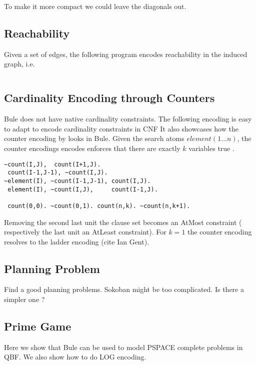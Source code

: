 \documentclass[conference]{IEEEtran}
\begin{document}
To make it more compact we could leave the diagonals out. 

\subsection{Reachability}

Given a set of edges, the following program encodes reachability in the induced graph, i.e. 

\begin{lstlisting}

\end{lstlisting}

\subsection{Cardinality Encoding through Counters}

Bule does not have native cardinality constraints. 
The following encoding is easy to adapt to encode cardinality constraints in CNF 
It also showcases how the counter encoding by \cite{Sinz05} looks in Bule. 
Given the search atoms $element(1\ldots n)$, the counter encodings encodes enforces that there are exactly $k$  variables true .

\begin{lstlisting}
~count(I,J),  count(I+1,J).
 count(I-1,J-1), ~count(I,J).
~element(I), ~count(I-1,J-1), count(I,J).
 element(I), ~count(I,J),     count(I-1,J).

 count(0,0). ~count(0,1). count(n,k). ~count(n,k+1).
\end{lstlisting}

Removing the second last unit the clause set becomes an AtMost constraint ( respectively the last unit an AtLeast constraint). 
For $k=1$ the counter encoding resolves to the ladder encoding (cite Ian Gent). 

\subsection{Planning Problem}

Find a good planning problems. 
Sokoban might be too complicated. 
Is there a simpler one ? 

\subsection{Prime Game}

Here we show that Bule can be used to model PSPACE complete problems in QBF. 
We also show how to do LOG encoding.  
\end{document}
